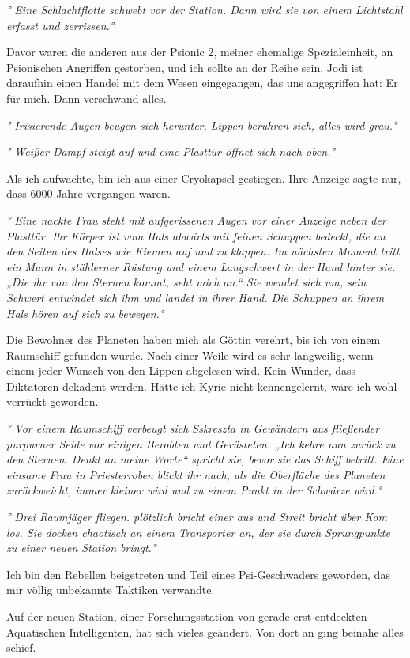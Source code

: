 \documentclass[11pt]{article}
\begin{document}
\emph{° Eine Schlachtflotte schwebt vor der Station. Dann wird sie von
einem Lichtstahl erfasst und zerrissen.°}

Davor waren die anderen aus der Psionic 2, meiner ehemalige
Spezialeinheit, an Psionischen Angriffen gestorben, und ich sollte an
der Reihe sein. Jodi ist daraufhin einen Handel mit dem Wesen
eingegangen, das uns angegriffen hat: Er für mich. Dann verschwand
alles.

\emph{° Irisierende Augen beugen sich herunter, Lippen berühren sich,
alles wird grau.°}

\emph{° Weißer Dampf steigt auf und eine Plasttür öffnet sich nach
oben.°}

Als ich aufwachte, bin ich aus einer Cryokapsel gestiegen. Ihre Anzeige
sagte nur, dass 6000 Jahre vergangen waren.

\emph{° Eine nackte Frau steht mit aufgerissenen Augen vor einer Anzeige
neben der Plasttür. Ihr Körper ist vom Hals abwärts mit feinen Schuppen
bedeckt, die an den Seiten des Halses wie Kiemen auf und zu klappen. Im
nächsten Moment tritt ein Mann in stählerner Rüstung und einem
Langschwert in der Hand hinter sie. „Die ihr von den Sternen kommt, seht
mich an.`` Sie wendet sich um, sein Schwert entwindet sich ihm und
landet in ihrer Hand. Die Schuppen an ihrem Hals hören auf sich zu
bewegen.°}

Die Bewohner des Planeten haben mich als Göttin verehrt, bis ich von
einem Raumschiff gefunden wurde. Nach einer Weile wird es sehr
langweilig, wenn einem jeder Wunsch von den Lippen abgelesen wird. Kein
Wunder, dass Diktatoren dekadent werden. Hätte ich Kyrie nicht
kennengelernt, wäre ich wohl verrückt geworden.

\emph{° Vor einem Raumschiff verbeugt sich Sskreszta in Gewändern aus
fließender purpurner Seide vor einigen Berobten und Gerüsteten. „Ich
kehre nun zurück zu den Sternen. Denkt an meine Worte`` spricht sie,
bevor sie das Schiff betritt. Eine einsame Frau in Priesterroben blickt
ihr nach, als die Oberfläche des Planeten zurückweicht, immer kleiner
wird und zu einem Punkt in der Schwärze wird.°}

\emph{° Drei Raumjäger fliegen. plötzlich bricht einer aus und Streit
bricht über Kom los. Sie docken chaotisch an einem Transporter an, der
sie durch Sprungpunkte zu einer neuen Station bringt.°}

Ich bin den Rebellen beigetreten und Teil eines Psi-Geschwaders
geworden, das mir völlig unbekannte Taktiken verwandte.

Auf der neuen Station, einer Forschungsstation von gerade erst
entdeckten Aquatischen Intelligenten, hat sich vieles geändert. Von dort
an ging beinahe alles schief.
\end{document}
